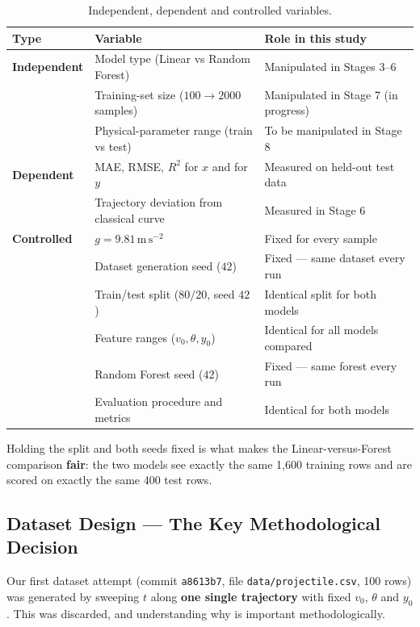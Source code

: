 \documentclass[11pt,a4paper]{article}
\newcommand{\vzero}{v_{0}}
\newcommand{\yzero}{y_{0}}
\newcommand{\msq}{\,\mathrm{m\,s^{-2}}}
\newcommand{\Rsq}{R^{2}}
\begin{document}
\begin{table}[h]
\centering
\small
\caption{Independent, dependent and controlled variables.}
\begin{tabular}{@{}llp{6.4cm}@{}}
\toprule
\textbf{Type} & \textbf{Variable} & \textbf{Role in this study} \\
\midrule
\textbf{Independent}
  & Model type (Linear vs Random Forest)      & Manipulated in Stages 3--6 \\
  & Training-set size ($100\to2000$ samples)  & Manipulated in Stage 7 (in progress) \\
  & Physical-parameter range (train vs test)  & To be manipulated in Stage 8 \\
\midrule
\textbf{Dependent}
  & MAE, RMSE, $\Rsq$ for $x$ and for $y$     & Measured on held-out test data \\
  & Trajectory deviation from classical curve & Measured in Stage 6 \\
\midrule
\textbf{Controlled}
  & $g=9.81\msq$                              & Fixed for every sample \\
  & Dataset generation seed ($42$)            & Fixed --- same dataset every run \\
  & Train/test split ($80/20$, seed $42$)     & Identical split for both models \\
  & Feature ranges ($\vzero,\theta,\yzero$)   & Identical for all models compared \\
  & Random Forest seed ($42$)                 & Fixed --- same forest every run \\
  & Evaluation procedure and metrics          & Identical for both models \\
\bottomrule
\end{tabular}
\end{table}

Holding the split and both seeds fixed is what makes the Linear-versus-Forest comparison
\textbf{fair}: the two models see exactly the same 1{,}600 training rows and are scored on exactly
the same 400 test rows.

\subsection{Dataset Design --- The Key Methodological Decision}\label{sec:datasetdesign}

Our first dataset attempt (commit \texttt{a8613b7}, file \texttt{data/projectile.csv}, 100 rows)
was generated by sweeping $t$ along \textbf{one single trajectory} with fixed $\vzero$, $\theta$
and $\yzero$. This was discarded, and understanding why is important methodologically.
\end{document}
